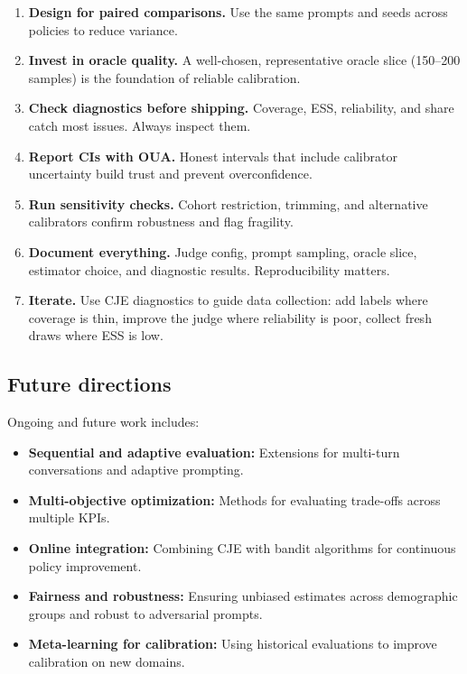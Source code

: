 \begin{enumerate}
\item \textbf{Design for paired comparisons.} Use the same prompts and seeds across policies to reduce variance.

\item \textbf{Invest in oracle quality.} A well-chosen, representative oracle slice (150--200 samples) is the foundation of reliable calibration.

\item \textbf{Check diagnostics before shipping.} Coverage, ESS, reliability, and \oua{} share catch most issues. Always inspect them.

\item \textbf{Report CIs with OUA.} Honest intervals that include calibrator uncertainty build trust and prevent overconfidence.

\item \textbf{Run sensitivity checks.} Cohort restriction, trimming, and alternative calibrators confirm robustness and flag fragility.

\item \textbf{Document everything.} Judge config, prompt sampling, oracle slice, estimator choice, and diagnostic results. Reproducibility matters.

\item \textbf{Iterate.} Use CJE diagnostics to guide data collection: add labels where coverage is thin, improve the judge where reliability is poor, collect fresh draws where ESS is low.
\end{enumerate}

\subsection{Future directions}

Ongoing and future work includes:
\begin{itemize}
\item \textbf{Sequential and adaptive evaluation:} Extensions for multi-turn conversations and adaptive prompting.
\item \textbf{Multi-objective optimization:} Methods for evaluating trade-offs across multiple KPIs.
\item \textbf{Online integration:} Combining CJE with bandit algorithms for continuous policy improvement.
\item \textbf{Fairness and robustness:} Ensuring unbiased estimates across demographic groups and robust to adversarial prompts.
\item \textbf{Meta-learning for calibration:} Using historical evaluations to improve calibration on new domains.
\end{itemize}

